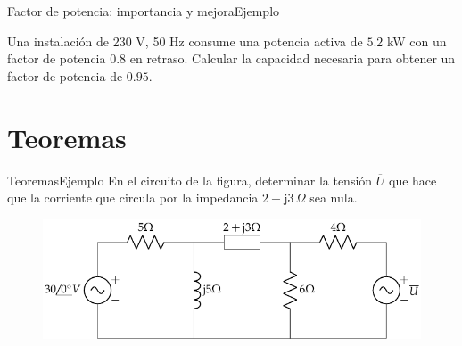 \documentclass[aspectratio=169, xcolor={usenames,svgnames,dvipsnames}]{beamer}
\begin{document}
\begin{frame}{Factor de potencia: importancia y mejora}{Ejemplo}

Una instalación de 230 V, 50 Hz consume una potencia activa de $5.2$ kW con un factor de potencia $0.8$ en retraso. Calcular la capacidad necesaria para obtener un factor de potencia de $0.95$.
\end{frame}

\section{Teoremas}

\begin{frame}{Teoremas}{Ejemplo}
    {En el circuito de la figura, determinar la tensión $\overline{U}$ que hace que la corriente que circula por la impedancia $2+\mathrm{j}3\,\Omega$ sea nula.}
		\begin{figure}[H]
			\centering
			\includegraphics[width=0.7\linewidth]{../figs/ej6_BT2.pdf}
		\end{figure}
\end{frame}
\end{document}
